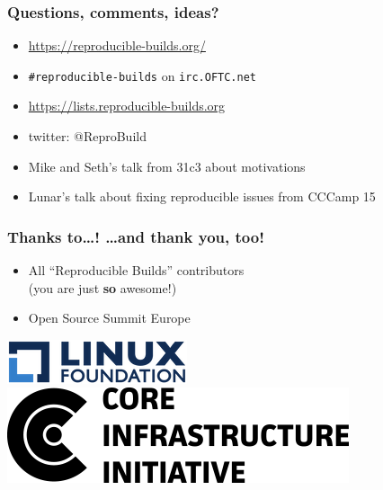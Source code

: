\documentclass[14pt,aspectratio=169]{beamer}
\newif\ifplacelogo
\begin{document}
\placelogofalse

\begin{frame}
 \frametitle{Questions, comments, ideas?}

 \begin{itemize}
  \item \url{https://reproducible-builds.org/}
  \item \texttt{\#reproducible-builds} on \texttt{irc.OFTC.net}
  \item \url{https://lists.reproducible-builds.org}
  \item twitter: @ReproBuild
  \item<2> Mike and Seth's talk from 31c3 about motivations
  \item<2> Lunar's talk about fixing reproducible issues from CCCamp 15
  \end{itemize}
\end{frame}

\placelogotrue

\begin{frame}
 \frametitle{Thanks to…! …and thank \textbf{you}, too!}

 \begin{itemize}
  \item
    {All “Reproducible Builds” contributors \\
        {\small (you are just \textbf{so} awesome!)}}
  \item Open Source Summit Europe
\end{itemize}

 \begin{center}
  \includegraphics[height=0.1\paperheight]{images/linux_foundation_logo.png}
  \hspace{0.1\paperwidth}
  \includegraphics[height=0.1\paperheight]{images/cii_logo.png}
 \end{center}

 \vfill
 \begin{center}
 \end{center}
\end{frame}
\end{document}
